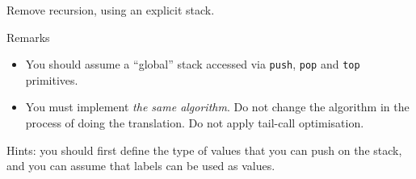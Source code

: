 \documentclass{article}
\begin{document}
Remove recursion, using an explicit stack. 

Remarks

\begin{itemize}
\item  You should assume a ``global'' stack accessed via \texttt{push},
  \texttt{pop} and \texttt{top} primitives.

\item You must implement \emph{the same algorithm}. Do not change the
  algorithm in the process of doing the translation. Do not apply
  tail-call optimisation.
\end{itemize}

Hints: you should first define the type of values that you can push on
the stack, and you can assume that labels can be used as values.
\end{document}
